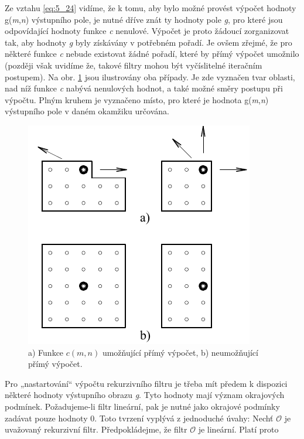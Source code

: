Ze vztahu \eqref{eq:5_24} vidíme, že k tomu, aby bylo možné provést výpočet hodnoty g(\textit{m},\textit{n}) výstupního pole, je nutné dříve znát ty hodnoty pole \textit{g}, pro které jsou odpovídající hodnoty funkce \textit{c} nenulové. Výpočet je proto žádoucí zorganizovat tak, aby hodnoty \textit{g} byly získávány v potřebném pořadí. Je ovšem zřejmé, že pro některé funkce \textit{c} nebude existovat žádné pořadí, které by přímý výpočet umožnilo (později však uvidíme že, takové filtry mohou být vyčíslitelné iteračním postupem). Na obr. \ref{img:5_2} jsou ilustrovány oba případy. Je zde vyznačen tvar oblasti, nad níž funkce \textit{c} nabývá nenulových hodnot, a také možné směry postupu při výpočtu. Plným kruhem je vyznačeno místo, pro které je hodnota g(\textit{m},\textit{n}) výstupního pole v daném okamžiku určována.

\begin{figure}[th]
    \begin{center}
        \includegraphics[scale=1.0]{05_filtrace/images/img_5_2.pdf}
    \end{center}
    \caption{a) Funkce $c(m, n)$ umožňující přímý výpočet, b) neumožňující přímý výpočet.}
    \label{img:5_2}
\end{figure}

Pro „nastartování`` výpočtu rekurzivního filtru je třeba mít předem k dispozici některé hodnoty výstupního obrazu \textit{g}. Tyto hodnoty mají význam okrajových podmínek. Požadujeme-li filtr lineární, pak je nutné jako okrajové podmínky zadávat pouze hodnoty 0. Toto tvrzení vyplývá z jednoduché úvahy: Nechť $\mathscr{O}$ je uvažovaný rekurzivní filtr. Předpokládejme, že filtr $\mathscr{O}$ je lineární. Platí proto

